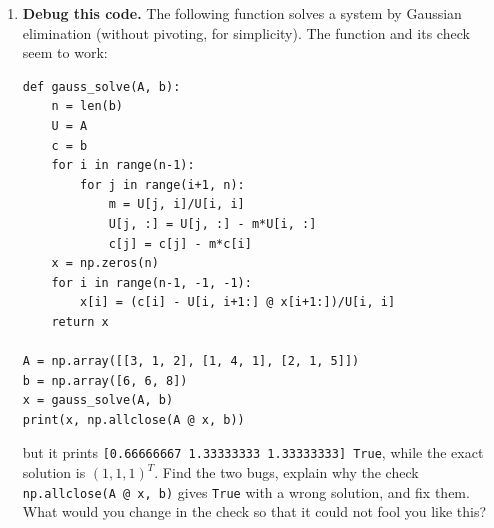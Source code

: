 \begin{enumerate}
\begin{verbatim}
# (b): same loop, but with  xs1 = w*xs1 + (1 - w)*xs  as the last line
#      inside the loop over i
# (c): same loop, but with  xs1[i] = w*xs1[i] + (1 - w)*xs[i]  as the
#      last line inside the loop over i
\end{verbatim}
\begin{enumerate}
\item Without running them, say which one is the SOR method and which iterative method each of the others implements.
\item Write the three functions and compare one iteration of each with the matrix form of the SOR method, $f+H\cdot x$, starting from $x=(1,1,1)^T$, for the system in the text with matrix $\left(\begin{smallmatrix}4&2&-1\\3&-5&1\\1&-1&6\end{smallmatrix}\right)$ and $\omega=0.8$.
\item Solve with the three of them the string system of section \ref{sec:parada_it-2} with $\omega=1.5$ and tolerance $10^{-8}$. How many iterations does each one need? Do they all converge to the correct solution? Do the same with the previous system and $\omega=0.8$. What does this teach you about checking an iterative method just by looking at whether it \emph{converges}?
\end{enumerate}

\item \label{ej:depura_gauss-en} \textbf{Debug this code.} The following function solves a system by Gaussian elimination (without pivoting, for simplicity). The function and its check seem to work:
\begin{verbatim}
def gauss_solve(A, b):
    n = len(b)
    U = A
    c = b
    for i in range(n-1):
        for j in range(i+1, n):
            m = U[j, i]/U[i, i]
            U[j, :] = U[j, :] - m*U[i, :]
            c[j] = c[j] - m*c[i]
    x = np.zeros(n)
    for i in range(n-1, -1, -1):
        x[i] = (c[i] - U[i, i+1:] @ x[i+1:])/U[i, i]
    return x

A = np.array([[3, 1, 2], [1, 4, 1], [2, 1, 5]])
b = np.array([6, 6, 8])
x = gauss_solve(A, b)
print(x, np.allclose(A @ x, b))
\end{verbatim}
but it prints \texttt{[0.66666667 1.33333333 1.33333333] True}, while the exact solution is $(1,1,1)^T$. Find the two bugs, explain why the check \texttt{np.allclose(A @ x, b)} gives \texttt{True} with a wrong solution, and fix them. What would you change in the check so that it could not fool you like this?


\end{enumerate}
